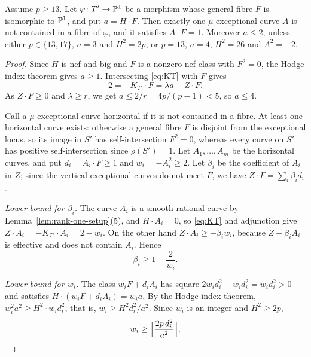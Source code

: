 \begin{lemma}\label{lem:ruling}
Assume $p\geq 13$.
Let $\varphi\colon T'\to\mathbb{P}^1$ be a morphism whose general fibre $F$ is isomorphic to $\mathbb{P}^1$, and put $a = H\cdot F$.
Then exactly one $\mu$-exceptional curve $A$ is not contained in a fibre of $\varphi$, and it satisfies $A\cdot F = 1$.
Moreover $a\leq 2$, unless either $p\in\{13,17\}$, $a = 3$ and $H^2 = 2p$, or $p = 13$, $a = 4$, $H^2 = 26$ and $A^2 = -2$.
\end{lemma}

\begin{proof}
Since $H$ is nef and big and $F$ is a nonzero nef class with $F^2 = 0$, the Hodge index theorem gives $a\geq 1$.
Intersecting \eqref{eq:KT} with $F$ gives
\begin{equation}\label{eq:EF}
  2 = -K_{T'}\cdot F = \lambda a+Z\cdot F.
\end{equation}
As $Z\cdot F\geq 0$ and $\lambda\geq r$, we get $a\leq 2/r = 4p/(p-1)<5$, so $a\leq 4$.

Call a $\mu$-exceptional curve horizontal if it is not contained in a fibre.
At least one horizontal curve exists: otherwise a general fibre $F$ is disjoint from the exceptional locus, so its image in $S'$ has self-intersection $F^2 = 0$, whereas every curve on $S'$ has positive self-intersection since $\rho(S') = 1$.
Let $A_1,\dots,A_m$ be the horizontal curves, and put $d_i = A_i\cdot F\geq 1$ and $w_i = -A_i^2\geq 2$.
Let $\beta_i$ be the coefficient of $A_i$ in $Z$; since the vertical exceptional curves do not meet $F$, we have $Z\cdot F = \sum_i\beta_id_i$.

\emph{Lower bound for $\beta_i$.}
The curve $A_i$ is a smooth rational curve by Lemma~\ref{lem:rank-one-setup}(5), and $H\cdot A_i = 0$, so \eqref{eq:KT} and adjunction give $Z\cdot A_i = -K_{T'}\cdot A_i = 2-w_i$.
On the other hand $Z\cdot A_i\geq-\beta_iw_i$, because $Z-\beta_iA_i$ is effective and does not contain $A_i$.
Hence
\[
  \beta_i\geq 1-\frac{2}{w_i}.
\]

\emph{Lower bound for $w_i$.}
The class $w_iF+d_iA_i$ has square $2w_id_i^2-w_id_i^2 = w_id_i^2>0$ and satisfies $H\cdot(w_iF+d_iA_i) = w_ia$.
By the Hodge index theorem, $w_i^2a^2\geq H^2\cdot w_id_i^2$, that is, $w_i\geq H^2d_i^2/a^2$.
Since $w_i$ is an integer and $H^2\geq 2p$,
\[
  w_i\geq\Bigl\lceil\frac{2p\,d_i^2}{a^2}\Bigr\rceil.
\]


\end{proof}

